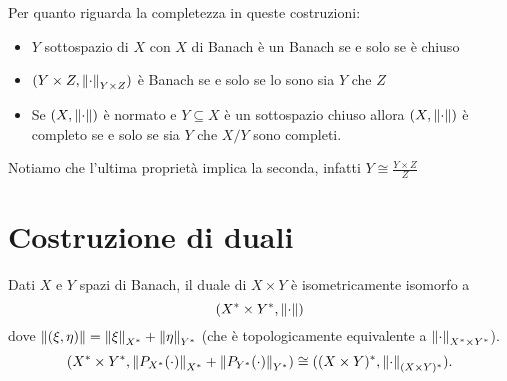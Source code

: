 \begin{remark}
Per quanto riguarda la completezza in queste costruzioni:
\begin{itemize}
    \item $Y$ sottospazio di $X$ con $X$ di Banach \`e un Banach se e solo se \`e chiuso
    \item $(Y\times Z,\left\Vert{\cdot}\right\Vert_{Y\times Z})$ \`e Banach se e solo se lo sono sia $Y$ che $Z$
    \item Se $(X,\left\Vert{\cdot}\right\Vert)$ \`e normato e $Y\subseteq X$ \`e un sottospazio chiuso allora $(X,\left\Vert{\cdot}\right\Vert)$ \`e completo se e solo se sia $Y$ che $X/Y$ sono completi.
\end{itemize}
Notiamo che l'ultima propriet\`a implica la seconda, infatti $Y\cong \frac{Y\times Z}Z$
\end{remark}


\section{Costruzione di duali}

\begin{proposition}\label{PrDualeProdottoEProdottoDuali}
Dati $X$ e $Y$ spazi di Banach, il duale di $X\times Y$ \`e isometricamente isomorfo a
\[(X^\ast\times Y^\ast,\left\Vert{\cdot}\right\Vert)\]
dove $\left\Vert{(\xi,\eta)}\right\Vert=\left\Vert{\xi}\right\Vert_{X^\ast}+\left\Vert{\eta}\right\Vert_{Y^\ast}$ (che \`e topologicamente equivalente a $\left\Vert{\cdot}\right\Vert_{X^\ast\times Y^\ast}$).
\[(X^\ast\times Y^\ast,\left\Vert{P_{X^\ast}(\cdot)}\right\Vert_{X^\ast}+\left\Vert{P_{Y^\ast}(\cdot)}\right\Vert_{Y^\ast})\cong ((X\times Y)^\ast,\left\Vert{\cdot}\right\Vert_{(X\times Y)^\ast}).\]
\end{proposition}
 


